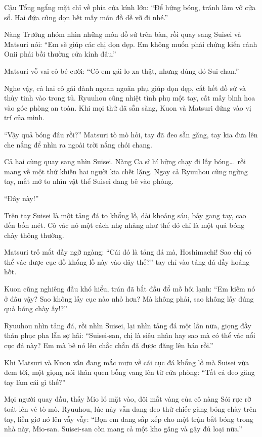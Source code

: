 \documentclass[../main.tex]{subfiles}
\begin{document}
Cậu Tổng ngẩng mặt chỉ về phía cửa kính lớn: ``Để hứng bóng, tránh làm vỡ cửa sổ. Hai đứa cũng dọn hết mấy món đồ dễ vỡ đi nhé.''

Nàng Trưởng nhóm nhìn những món đồ sứ trên bàn, rồi quay sang Suisei và Matsuri nói: ``Em sẽ giúp các chị dọn dẹp. Em không muốn phải chứng kiến cảnh Onii phải bồi thường cửa kính đâu.''

Matsuri vỗ vai cô bé cười: ``Cô em gái lo xa thật, nhưng đúng đó Sui-chan.''

Nghe vậy, cả hai cô gái đành ngoan ngoãn phụ giúp dọn dẹp, cất hết đồ sứ và thủy tinh vào trong tủ. Ryuuhou cũng nhiệt tình phụ một tay, cất mấy bình hoa vào góc phòng an toàn. Khi mọi thứ đã sẵn sàng, Kuon và Matsuri đứng vào vị trí của mình.

``Vậy quả bóng đâu rồi?'' Matsuri tò mò hỏi, tay đã đeo sẵn găng, tay kia đưa lên che nắng để nhìn ra ngoài trời nắng chói chang.

Cả hai cùng quay sang nhìn Suisei. Nàng Ca sĩ hí hửng chạy đi lấy bóng\dots\ rồi mang về một thứ khiến hai người kia chết lặng. Ngay cả Ryuuhou cũng ngừng tay, mắt mở to nhìn vật thể Suisei đang bê vào phòng.

``Đây này!''

Trên tay Suisei là một tảng đá to khổng lồ, dài khoảng sáu, bảy gang tay, cao đến bốn mét. Cô vác nó một cách nhẹ nhàng như thể đó chỉ là một quả bóng chày thông thường.


Matsuri trố mắt đầy ngỡ ngàng: ``Cái đó là tảng đá mà, Hoshimachi! Sao chị có thể vác được cục đồ khổng lồ này vào đây thế?'' tay chỉ vào tảng đá đầy hoảng hốt.

Kuon cũng nghiêng đầu khó hiểu, trán đã bắt đầu đổ mồ hôi lạnh: ``Em kiếm nó ở đâu vậy? Sao không lấy cục nào nhỏ hơn? Mà không phải, sao không lấy đúng quả bóng chày ấy!?''

Ryuuhou nhìn tảng đá, rồi nhìn Suisei, lại nhìn tảng đá một lần nữa, giọng đầy thán phục pha lẫn sợ hãi: ``Suisei-san, chị là siêu nhân hay sao mà có thể vác nổi cục đá này? Em mà bê nó lên chắc chắn đã được đăng lên báo rồi.''

Khi Matsuri và Kuon vẫn đang mắc mưu về cái cục đá khổng lồ mà Suisei vừa đem tới, một giọng nói thân quen bỗng vang lên từ cửa phòng: ``Tất cả đeo găng tay làm cái gì thế?''

Mọi người quay đầu, thấy Mio ló mặt vào, đôi mắt vàng của cô nàng Sói rực rỡ toát lên vẻ tò mò. Ryuuhou, lúc này vẫn đang đeo thử chiếc găng bóng chày trên tay, liền giơ nó lên vẫy vẫy: ``Bọn em đang sắp xếp cho một trận bắt bóng trong nhà này, Mio-san. Suisei-san còn mang cả một kho găng và gậy đủ loại nữa.''
\end{document}
